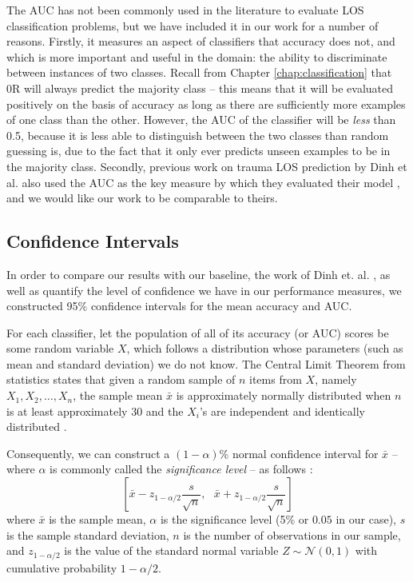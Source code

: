 The AUC has not been commonly used in the literature to evaluate LOS
classification problems, but we have included it in our work for a number of
reasons. Firstly, it measures an aspect of classifiers that accuracy does not,
and which is more important and useful in the domain: the ability to
discriminate between instances of two classes. Recall from Chapter
\ref{chap:classification} that 0R will always predict the majority class --
this means that it will be evaluated positively on the basis of accuracy
as long as there are sufficiently more examples of one class than the other.
However, the AUC of the classifier will be \textit{less} than 0.5, because it
is less able to distinguish between the two classes than random guessing is,
due to the fact that it only ever predicts unseen examples to be in the
majority class. Secondly, previous work on trauma LOS prediction by Dinh et al.
also used the AUC as the key measure by which they evaluated their model
\cite{Dinh2013a}, and we would like our work to be comparable to theirs.

\subsection{Confidence Intervals}
In order to compare our results with our baseline, the work of Dinh et. al.
\citep{Dinh2013a}, as well as quantify the level of confidence we have in
our performance measures, we constructed 95\% confidence intervals for the
mean accuracy and AUC.

For each classifier, let the population of all of its accuracy (or AUC)
scores be some random variable $X$, which follows a distribution whose
parameters (such as mean and standard deviation) we do not know.
The Central Limit Theorem from statistics states that given a random
sample of $n$ items from $X$, namely $X_1,X_2,\dots,X_n$, the sample mean
$\bar{x}$
is approximately normally distributed when $n$ is at least approximately 30
and the $X_i$'s are independent and identically distributed \cite{Phipps2001}.

Consequently, we can construct a $(1-\alpha)$\% normal confidence interval for
$\bar{x}$ -- where $\alpha$ is commonly called the
\textit{significance level} -- as follows \cite{Wasserman2003}:
\begin{equation*}
  \left[\bar{x} - z_{1-\alpha/2}\dfrac{s}{\sqrt{n}},\text{ }
    \bar{x} + z_{1-\alpha/2}\dfrac{s}{\sqrt{n}}\right]
\end{equation*}
where $\bar{x}$ is the sample mean, $\alpha$ is the significance level
(5\% or $0.05$ in our case), $s$ is the sample standard deviation, $n$
is the number of observations in our sample, and $z_{1-\alpha/2}$ is the value
of the standard normal variable $Z \sim \mathcal{N}(0,1)$ with cumulative
probability $1-\alpha/2$.

